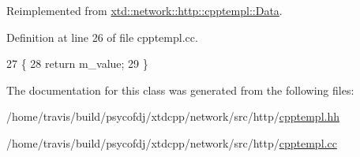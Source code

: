 Reimplemented from \hyperlink{classxtd_1_1network_1_1http_1_1cpptempl_1_1Data_a85999dd8f43177cabf072ddbc406e556}{xtd\-::network\-::http\-::cpptempl\-::\-Data}.



Definition at line 26 of file cpptempl.\-cc.


\begin{DoxyCode}
27 \{
28   \textcolor{keywordflow}{return} m\_value;
29 \}
\end{DoxyCode}


The documentation for this class was generated from the following files\-:\begin{DoxyCompactItemize}
\item 
/home/travis/build/psycofdj/xtdcpp/network/src/http/\hyperlink{cpptempl_8hh}{cpptempl.\-hh}\item 
/home/travis/build/psycofdj/xtdcpp/network/src/http/\hyperlink{cpptempl_8cc}{cpptempl.\-cc}\end{DoxyCompactItemize}
